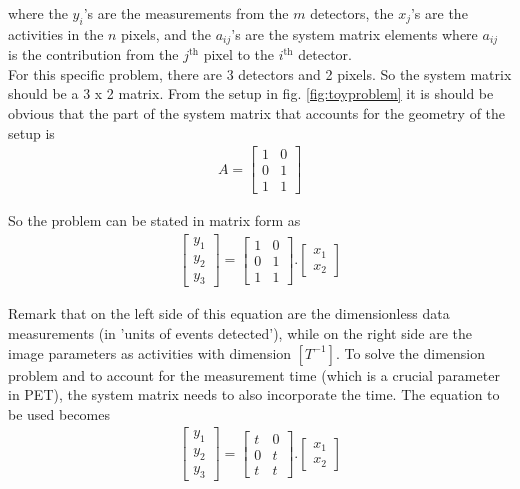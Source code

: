 \documentclass[report,12pt]{report}
\newcommand{\superscript}[1]{\ensuremath{^{\textrm{#1}}}}
\begin{document}
where the $y_i$'s are the measurements from the $m$ detectors, the $x_j$'s are the activities in the $n$ pixels, and the $a_{ij}$'s are the system matrix elements where $a_{ij}$ is the contribution from the $j$\superscript{th} pixel to the $i$\superscript{th} detector.\\

For this specific problem, there are 3 detectors and 2 pixels. So the system matrix should be a 3 x 2 matrix. From the setup in fig. \ref{fig:toyproblem} it is should be obvious that the part of the system matrix that accounts for the geometry of the setup is
\begin{align}
	A = \left[ \begin{array}{cc} 1 & 0 \\ 0 & 1 \\ 1 & 1 \end{array} \right]
\end{align}

So the problem can be stated in matrix form as
\begin{align}
	\left[ \begin{array}{c} 
	y_1 \\ y_2 \\ y_3 
	\end{array} \right]  
	=
	\left[ \begin{array}{cc} 
	1 & 0 \\ 0 & 1 \\ 1 & 1 
	\end{array} \right]
	.
	\left[ \begin{array}{c} x_1 \\ x_2 \end{array} \right] 
	\label{eq:toyproblem}
\end{align}

Remark that on the left side of this equation are the dimensionless data measurements (in 'units of events detected'), while on the right side are the image parameters as activities with dimension $[T^{-1}]$. To solve the dimension problem and to account for the measurement time (which is a crucial parameter in PET), the system matrix needs to also incorporate the time. The  equation to be used becomes
\begin{align}
	\left[ \begin{array}{c} 
	y_1 \\ y_2 \\ y_3 
	\end{array} \right]  
	=
	\left[ \begin{array}{cc} 
	t & 0 \\ 0 & t \\ t & t 
	\end{array} \right]
	.
	\left[ \begin{array}{c} x_1 \\ x_2 \end{array} \right] 
	\label{eq:e}
\end{align}
\end{document}
